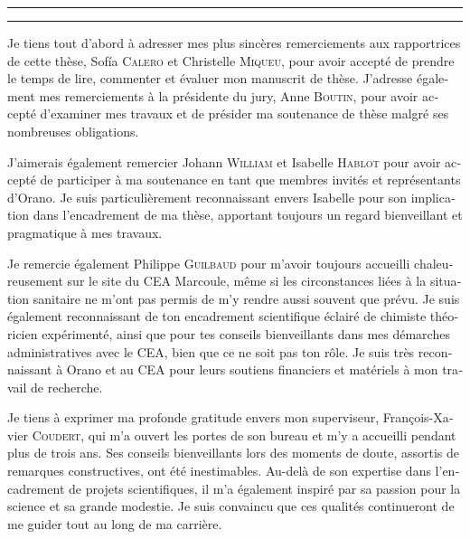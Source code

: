 \begin{otherlanguage}{french}

\hrule\relax
\vspace*{.9\baselineskip}%
\raggedright{\huge{}}\par%
\vspace*{1.1\baselineskip}%
\hrule\relax
\vspace*{\baselineskip}%
\thispagestyle{empty}

\begingroup
\itshape

Je tiens tout d'abord à adresser mes plus sincères remerciements aux rapportrices de cette thèse, Sof{\'{i}}a \textsc{Calero} et Christelle \textsc{Miqueu}, pour avoir accepté de prendre le temps de lire, commenter et évaluer mon manuscrit de thèse. 
J'adresse également mes remerciements à la présidente du jury, Anne \textsc{Boutin}, pour avoir accepté d'examiner mes travaux et de présider ma soutenance de thèse malgré ses nombreuses obligations.

J'aimerais également remercier Johann \textsc{William} et Isabelle \textsc{Hablot} pour avoir accepté de participer à ma soutenance en tant que membres invités et représentants d'Orano. Je suis particulièrement reconnaissant envers Isabelle pour son implication dans l'encadrement de ma thèse, apportant toujours un regard bienveillant et pragmatique à mes travaux.

Je remercie également Philippe \textsc{Guilbaud} pour m'avoir toujours accueilli chaleureusement sur le site du CEA Marcoule, même si les circonstances liées à la situation sanitaire ne m'ont pas permis de m'y rendre aussi souvent que prévu. Je suis également reconnaissant de ton encadrement scientifique éclairé de chimiste théoricien expérimenté, ainsi que pour tes conseils bienveillants dans mes démarches administratives avec le CEA, bien que ce ne soit pas ton rôle. Je suis très reconnaissant à Orano et au CEA pour leurs soutiens financiers et matériels à mon travail de recherche.

Je tiens à exprimer ma profonde gratitude envers mon superviseur, François-Xavier \textsc{Coudert}, qui m'a ouvert les portes de son bureau et m'y a accueilli pendant plus de trois ans. Ses conseils bienveillants lors des moments de doute, assortis de remarques constructives, ont été inestimables. Au-delà de son expertise dans l'encadrement de projets scientifiques, il m'a également inspiré par sa passion pour la science et sa grande modestie. Je suis convaincu que ces qualités continueront de me guider tout au long de ma carrière.


\end{otherlanguage}
